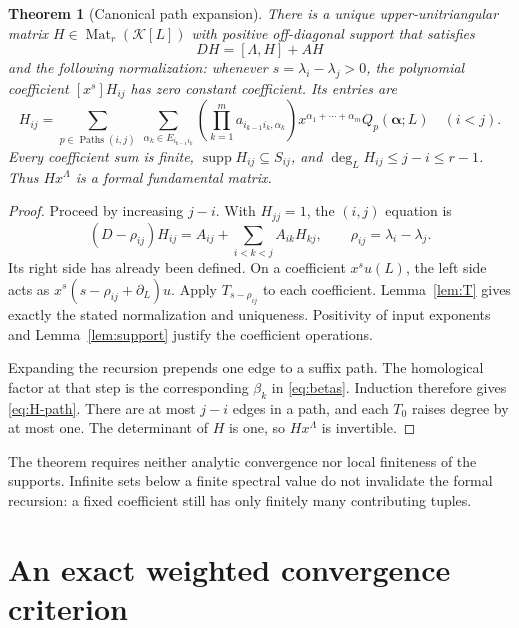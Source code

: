 \documentclass[11pt,a4paper]{article}
\numberwithin{equation}{section}
\newtheorem{theorem}{Theorem}[section]
\theoremstyle{definition}
\theoremstyle{remark}
\newcommand{\K}{\mathcal K}
\newcommand{\supp}{\operatorname{supp}}
\newcommand{\Mat}{\operatorname{Mat}}
\newcommand{\Paths}{\operatorname{Paths}}
\begin{document}
\begin{theorem}[Canonical path expansion]\label{thm:formal}
There is a unique upper-unitriangular matrix $H\in\Mat_r(\K[L])$ with
positive off-diagonal support that satisfies
\begin{equation}\label{eq:H-equation}
 DH=[\Lambda,H]+AH
\end{equation}
and the following normalization: whenever
$s=\lambda_i-\lambda_j>0$, the polynomial coefficient $[x^s]H_{ij}$ has
zero constant coefficient. Its entries are
\begin{equation}\label{eq:H-path}
 H_{ij}=
 \sum_{p\in\Paths(i,j)}\ 
 \sum_{\alpha_k\in E_{i_{k-1}i_k}}
 \left(\prod_{k=1}^m a_{i_{k-1}i_k,\alpha_k}\right)
 x^{\alpha_1+\cdots+\alpha_m}Q_p(\boldsymbol\alpha;L)
 \quad(i<j).
\end{equation}
Every coefficient sum is finite, $\supp H_{ij}\subseteq S_{ij}$, and
$\deg_LH_{ij}\leq j-i\leq r-1$. Thus $Hx^\Lambda$ is a formal
fundamental matrix.
\end{theorem}
\begin{proof}
Proceed by increasing $j-i$. With $H_{jj}=1$, the $(i,j)$ equation is
\begin{equation}\label{eq:H-recursion}
 (D-\rho_{ij})H_{ij}
       =A_{ij}+\sum_{i<k<j}A_{ik}H_{kj},\qquad
 \rho_{ij}=\lambda_i-\lambda_j.
\end{equation}
Its right side has already been defined. On a coefficient $x^s u(L)$,
the left side acts as $x^s(s-\rho_{ij}+\partial_L)u$. Apply
$T_{s-\rho_{ij}}$ to each coefficient. Lemma~\ref{lem:T} gives exactly the
stated normalization and uniqueness. Positivity of input exponents and
Lemma~\ref{lem:support} justify the coefficient operations.

Expanding the recursion prepends one edge to a suffix path. The
homological factor at that step is the corresponding $\beta_k$ in
\eqref{eq:betas}. Induction therefore gives \eqref{eq:H-path}. There are
at most $j-i$ edges in a path, and each $T_0$ raises degree by at most one.
The determinant of $H$ is one, so $Hx^\Lambda$ is invertible.
\end{proof}

The theorem requires neither analytic convergence nor local finiteness of
the supports. Infinite sets below a finite spectral value do not invalidate
the formal recursion: a fixed coefficient still has only finitely many
contributing tuples.

\section{An exact weighted convergence criterion}
\label{sec:weighted}
\end{document}
